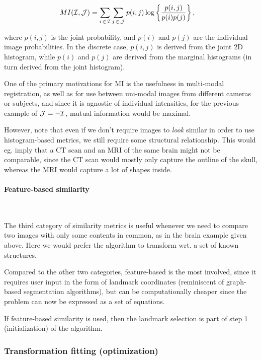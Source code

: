 \begin{align*}
  MI(\mathcal I, \mathcal J) &= \sum_{i\, \in \,\mathcal I} \sum_{j\, \in
  \,\mathcal J} p(i, j) \log\left\{\frac{p(i, j)}{p(i)p(j)}\right\},
\end{align*}

where $p(i, j)$ is the joint probability, and $p(i)$ and $p(j)$ are the
individual image probabilities. In the discrete case, $p(i, j)$ is derived from
the joint 2D histogram, while $p(i)$ and $p(j)$ are derived from the marginal
histograms (in turn derived from the joint histogram).


One of the primary motivations for MI is the usefulness in multi-modal
registration, as well as for use between uni-modal images from different cameras
or subjects, and since it is agnostic of individual intensities, for the
previous example of $\mathcal J = -\mathcal I$, mutual information would be maximal.

However, note that even if we don't require images to \textit{look} similar in
order to use histogram-based metrics, we still require some structural
relationship. This would eg. imply that a CT scan and an MRI of the same brain
might not be comparable, since the CT scan would mostly only capture the outline
of the skull, whereas the MRI would capture a lot of shapes inside.

\paragraph{Feature-based similarity}~

The third category of similarity metrics is useful whenever we need to compare
two images with only some contents in common, as in the brain example given
above. Here we would prefer the algorithm to transform wrt. a set of known
structures.

Compared to the other two categories, feature-based is the most involved, since
it requires user input in the form of landmark coordinates (reminiscent of
graph-based segmentation algorithms), but can be computationally cheaper since
the problem can now be expressed as a set of equations.

If feature-based similarity is used, then the landmark selection is part of step
1 (initialization) of the algorithm.

\subsubsection{Transformation fitting (optimization)}~

